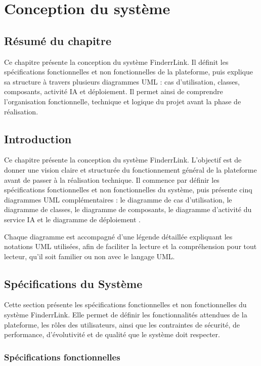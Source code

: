 
\chapter{Conception du système}
\section*{Résumé du chapitre}

Ce chapitre présente la conception du système FinderrLink. Il définit les spécifications fonctionnelles et non fonctionnelles de la plateforme, puis explique sa structure à travers plusieurs diagrammes UML : cas d'utilisation, classes, composants, activité IA et déploiement. Il permet ainsi de comprendre l'organisation fonctionnelle, technique et logique du projet avant la phase de réalisation.

\section{Introduction}

Ce chapitre présente la conception du système FinderrLink. L'objectif est de 
donner une vision claire et structurée du fonctionnement général de la 
plateforme avant de passer à la réalisation technique. Il commence par définir 
les spécifications fonctionnelles et non fonctionnelles du système, puis 
présente cinq diagrammes UML complémentaires : le diagramme de cas 
d'utilisation, le diagramme de classes, le diagramme de composants, le 
diagramme d'activité du service IA et le diagramme de déploiement \cite{uml}.

Chaque diagramme est accompagné d'une légende détaillée expliquant les 
notations UML utilisées, afin de faciliter la lecture et la compréhension pour 
tout lecteur, qu'il soit familier ou non avec le langage UML.
\section{Spécifications du Système}

Cette section présente les spécifications fonctionnelles et non fonctionnelles du système FinderrLink. Elle permet de définir les fonctionnalités attendues de la plateforme, les rôles des utilisateurs, ainsi que les contraintes de sécurité, de performance, d'évolutivité et de qualité que le système doit respecter.

\subsection{Spécifications fonctionnelles}

